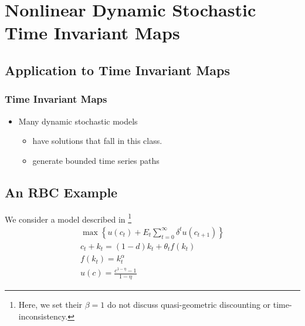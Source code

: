 \documentclass[notheorems]{beamer}
\begin{document}
\section{Nonlinear Dynamic Stochastic Time Invariant Maps}
\label{sec:extToMaps}



\subsection{Application to Time Invariant Maps}


\begin{frame}
  \frametitle{Time Invariant Maps}


  \begin{itemize}
\item  Many dynamic stochastic models 
  \begin{itemize}
  \item  have solutions that fall in this class.
\item  generate  bounded time series paths 
  \end{itemize}
  \end{itemize}



\subsection{An RBC Example}
\label{sec:rbcaux}
  We consider a model described in \cite{Maliar2005}\footnote{Here, we set their $\beta=1$ do not discuss quasi-geometric discounting or time-inconsistency.}
 \begin{gather*}
   \max\left \{  u(c_t) + E_t \sum_{t=0}^\infty  \delta^{t}u(c_{t+1})\right \}\\
c_t + k_t=(1-d)k_t + \theta_t f(k_t)\\
f(k_t)= k_t^\alpha\\
u(c)=\frac{c^{1-\eta}-1}{1-\eta}
 \end{gather*}
 \end{frame}
\end{document}
